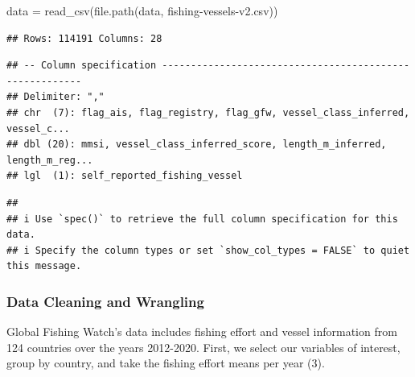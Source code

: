 \documentclass[
]{article}
\newenvironment{Shaded}{\begin{snugshade}}{\end{snugshade}}
\newcommand{\FunctionTok}[1]{\textcolor[rgb]{0.00,0.00,0.00}{#1}}
\newcommand{\NormalTok}[1]{#1}
\newcommand{\OtherTok}[1]{\textcolor[rgb]{0.56,0.35,0.01}{#1}}
\newcommand{\StringTok}[1]{\textcolor[rgb]{0.31,0.60,0.02}{#1}}
\begin{document}
\begin{Shaded}
\begin{Highlighting}[]
\NormalTok{data }\OtherTok{=} \FunctionTok{read\_csv}\NormalTok{(}\FunctionTok{file.path}\NormalTok{(}\StringTok{\textquotesingle{}data\textquotesingle{}}\NormalTok{, }\StringTok{\textquotesingle{}fishing{-}vessels{-}v2.csv\textquotesingle{}}\NormalTok{))}
\end{Highlighting}
\end{Shaded}

\begin{verbatim}
## Rows: 114191 Columns: 28
\end{verbatim}

\begin{verbatim}
## -- Column specification --------------------------------------------------------
## Delimiter: ","
## chr  (7): flag_ais, flag_registry, flag_gfw, vessel_class_inferred, vessel_c...
## dbl (20): mmsi, vessel_class_inferred_score, length_m_inferred, length_m_reg...
## lgl  (1): self_reported_fishing_vessel
\end{verbatim}

\begin{verbatim}
## 
## i Use `spec()` to retrieve the full column specification for this data.
## i Specify the column types or set `show_col_types = FALSE` to quiet this message.
\end{verbatim}

\hypertarget{data-cleaning-and-wrangling}{%
\subsubsection{Data Cleaning and
Wrangling}\label{data-cleaning-and-wrangling}}

Global Fishing Watch's data includes fishing effort and vessel
information from 124 countries over the years 2012-2020. First, we
select our variables of interest, group by country, and take the fishing
effort means per year (3).
\end{document}

